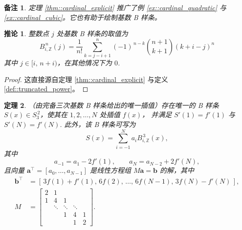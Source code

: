 \documentclass[a4paper]{ctexart}
\newtheorem{theorem}{定理}
\newtheorem{remark}{备注}
\newtheorem{corollary}[theorem]{推论}
\numberwithin{theorem}{section}
\numberwithin{equation}{section}
\numberwithin{figure}{section}
\numberwithin{remark}{section}
\begin{document}
\begin{remark}
    \label{rem::cardinal_generalizes}
定理 \ref{thm::cardinal_explicit} 推广了例 \ref{ex::cardinal_quadratic} 与 \ref{ex::cardinal_cubic}。它也有助于绘制基数 B 样条。
\end{remark}

\begin{corollary}
    \label{cor::cardinal_integer_values}
整数点 $j$ 处基数 B 样条的取值为
\begin{equation}
    \label{eq::cardinal_integer_values}
B^{\,n}_{i,\mathbb{Z}}(j)
=\frac{1}{n!}\sum_{k=j-i+1}^{n}(-1)^{\,n-k}\binom{n+1}{k+1}(k+i-j)^{n}
\end{equation}
其中 $j\in[i,\,n+i)$，在其他情况下为 $0$.
\end{corollary}

\begin{proof}
这直接源自定理 \ref{thm::cardinal_explicit} 与定义 \ref{def::truncated_power}。 
\end{proof}

\begin{theorem}
    \label{thm::unique_complete_cubic}
（由完备三次基数 B 样条给出的唯一插值）存在唯一的 B 样条 $S(x)\in S^{\,2}_{3}$，使其在 $1,2,\ldots,N$ 处插值 $f(x)$，
并满足 $S'(1)=f'(1)$ 与 $S'(N)=f'(N)$. 此外，该 B 样条可写为
\begin{equation}
\label{eq::unique_complete_cubic}
S(x)=\sum_{i=-1}^{N} a_i B^{\,3}_{i,\mathbb{Z}}(x),
\end{equation}
其中
\begin{equation}
\label{eq::cubic_boundary_conditions}
a_{-1}=a_1-2f'(1),\qquad
a_{N}=a_{N-2}+2f'(N),
\end{equation}
且向量 $\mathbf{a}^{\top}=[a_0,\ldots,a_{N-1}]$ 是线性方程组 $M\mathbf{a}=\mathbf{b}$ 的解，其中
\[
\begin{aligned}
\mathbf{b}^{\top}&=[\,3f(1)+f'(1),\,6f(2),\,\ldots,\,6f(N-1),\,3f(N)-f'(N)\,], \\
M&=
\begin{bmatrix}
2 & 1 &   &   &   \\
1 & 4 & 1 &   &   \\
  & \ddots & \ddots & \ddots & \\
  &   & 1 & 4 & 1 \\
  &   &   & 1 & 2
\end{bmatrix}.
\end{aligned}
\]
\end{theorem}
\end{document}
